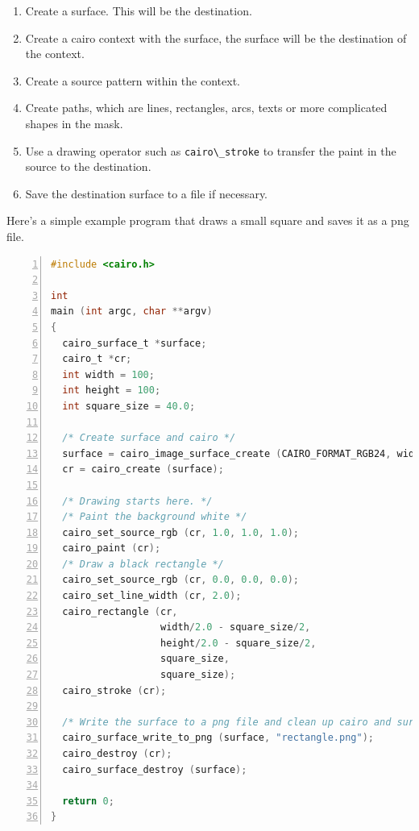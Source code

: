 \begin{enumerate}
\def\labelenumi{\arabic{enumi}.}
\tightlist
\item
  Create a surface. This will be the destination.
\item
  Create a cairo context with the surface, the surface will be the
  destination of the context.
\item
  Create a source pattern within the context.
\item
  Create paths, which are lines, rectangles, arcs, texts or more
  complicated shapes in the mask.
\item
  Use a drawing operator such as \passthrough{\lstinline!cairo\_stroke!}
  to transfer the paint in the source to the destination.
\item
  Save the destination surface to a file if necessary.
\end{enumerate}

Here's a simple example program that draws a small square and saves it
as a png file.

\begin{lstlisting}[language=C, numbers=left]
#include <cairo.h>

int
main (int argc, char **argv)
{
  cairo_surface_t *surface;
  cairo_t *cr;
  int width = 100;
  int height = 100;
  int square_size = 40.0;

  /* Create surface and cairo */
  surface = cairo_image_surface_create (CAIRO_FORMAT_RGB24, width, height);
  cr = cairo_create (surface);

  /* Drawing starts here. */
  /* Paint the background white */
  cairo_set_source_rgb (cr, 1.0, 1.0, 1.0);
  cairo_paint (cr);
  /* Draw a black rectangle */
  cairo_set_source_rgb (cr, 0.0, 0.0, 0.0);
  cairo_set_line_width (cr, 2.0);
  cairo_rectangle (cr,
                   width/2.0 - square_size/2,
                   height/2.0 - square_size/2,
                   square_size,
                   square_size);
  cairo_stroke (cr);

  /* Write the surface to a png file and clean up cairo and surface. */
  cairo_surface_write_to_png (surface, "rectangle.png");
  cairo_destroy (cr);
  cairo_surface_destroy (surface);

  return 0;
}
\end{lstlisting}

